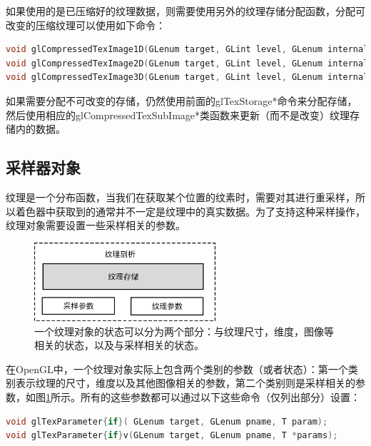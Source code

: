 如果使用的是已压缩好的纹理数据，则需要使用另外的纹理存储分配函数，分配可改变的压缩纹理可以使用如下命令：

\begin{lstlisting}[language=C++]
void glCompressedTexImage1D(GLenum target, GLint level, GLenum internalFormat, GLsizei width, GLint border, GLsizei imageSize, const void *data);
void glCompressedTexImage2D(GLenum target, GLint level, GLenum internalFormat, GLsizei width, GLsizei height, GLint border, GLsizei imageSize, const void *data);
void glCompressedTexImage3D(GLenum target, GLint level, GLenum internalFormat, GLsizei width, GLsizei height, GLsizei depth, GLint border, GLsizei imageSize, const void *data);
\end{lstlisting}

如果需要分配不可改变的存储，仍然使用前面的glTexStorage*命令来分配存储，然后使用相应的glCompressedTexSubImage*类函数来更新（而不是改变）纹理存储内的数据。






\subsection{采样器对象}
纹理是一个分布函数，当我们在获取某个位置的纹素时，需要对其进行重采样，所以着色器中获取到的通常并不一定是纹理中的真实数据。为了支持这种采样操作，纹理对象需要设置一些采样相关的参数。

\begin{figure}
\sidecaption
	\includegraphics[width=0.6\textwidth]{figures/api/texture-anatomy}
	\caption{一个纹理对象的状态可以分为两个部分：与纹理尺寸，维度，图像等相关的状态，以及与采样相关的状态。}
	\label{f:api-sampler-parameter}
\end{figure}

在OpenGL中，一个纹理对象实际上包含两个类别的参数（或者状态）：第一个类别表示纹理的尺寸，维度以及其他图像相关的参数，第二个类别则是采样相关的参数，如图\ref{f:api-sampler-parameter}所示。所有的这些参数都可以通过以下这些命令（仅列出部分）设置：

\begin{lstlisting}[language=C++]
void glTexParameter{if}( GLenum target​, GLenum pname​, T param​);
void glTexParameter{if}v​(GLenum target​, GLenum pname​, T *params​);
\end{lstlisting}

